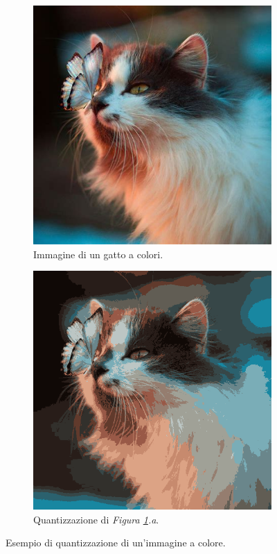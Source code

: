 \documentclass{subfiles}
\begin{document}
\begin{figure}[!h]
    \centering
    \begin{subfigure}[b]{0.425\textwidth}
        \centering
        \includegraphics[scale = 0.325]{../Images/Cat/Cat.png}
        \caption{Immagine di un gatto a colori.}
    \end{subfigure}
    \hspace{10pt}
    \begin{subfigure}[b]{0.425\textwidth}
        \centering
        \includegraphics[scale = 0.325]{../Images/Cat/Cat_16.png}
        \caption{Quantizzazione di \emph{Figura \ref{fig:5.5}.a}.}
    \end{subfigure}
    \caption{Esempio di quantizzazione di un'immagine a colore.}
    \label{fig:5.5}
\end{figure}
\end{document}

